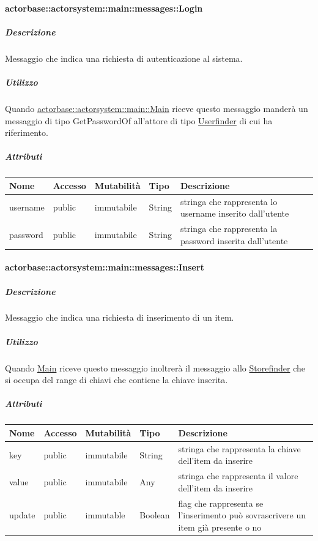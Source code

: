 \documentclass{scalatekids-article}
\begin{document}
\paragraph{actorbase::actorsystem::main::messages::Login}
\label{sec:actorbase::actorsystem::main::messages::Login}

\subparagraph{Descrizione}
Messaggio che indica una richiesta di autenticazione al sistema.

\subparagraph{Utilizzo}
Quando \hyperref[sec:actorbase::actorsystem::main::Main]{actorbase::actorsystem::main::Main}
riceve questo messaggio manderà un messaggio di tipo GetPasswordOf
all'attore di tipo \hyperref[sec:actorbase::actorsystem::userfinder::Userfinder]{Userfinder} di cui ha riferimento.

\subparagraph{Attributi}
\begin{tabular}{| p{3cm} | p{1.5cm} | p{2cm} | p{2cm} | p{8.5cm} |}
  \hline
  Nome & Accesso & Mutabilità & Tipo & Descrizione\\
  \hline
  username & public & immutabile & String & stringa che rappresenta lo username inserito dall'utente \\
  \hline
  password & public & immutabile & String & stringa che rappresenta la password inserita dall'utente \\
  \hline
\end{tabular}

\paragraph{actorbase::actorsystem::main::messages::Insert}
\label{sec:actorbase::actorsystem::main::messages::Insert}

\subparagraph{Descrizione}
Messaggio che indica una richiesta di inserimento di un item.

\subparagraph{Utilizzo}

Quando \hyperref[sec:actorbase::actorsystem::main::Main]{Main}
riceve questo messaggio inoltrerà il messaggio allo \hyperref[sec:actorbase::actorsystem::storefinder::Storefinder]{Storefinder}
che si occupa del range di chiavi che contiene la chiave inserita.

\subparagraph{Attributi}
\begin{tabular}{| p{3cm} | p{1.5cm} | p{2cm} | p{2cm} | p{8.5cm} |}
  \hline
  Nome & Accesso & Mutabilità & Tipo & Descrizione\\
  \hline
  key & public & immutabile & String & stringa che rappresenta la chiave dell'item da inserire \\
  \hline
  value & public & immutabile & Any & stringa che rappresenta il valore dell'item da inserire \\
  \hline
  update & public & immutable & Boolean & flag che rappresenta se l'inserimento può sovrascrivere un item già presente o no \\
  \hline
\end{tabular}
\end{document}
